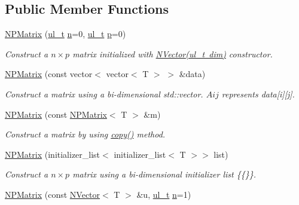 \subsection*{Public Member Functions}
\begin{DoxyCompactItemize}
\item 
\mbox{\hyperlink{class_n_p_matrix_a911b2434435553b06276977f3a86bb87}{N\+P\+Matrix}} (\mbox{\hyperlink{typedef_8h_a1b140a2034db3f5dfe18a987745df43a}{ul\+\_\+t}} \mbox{\hyperlink{class_n_p_matrix_afc181b7652d9427125c72c38d7c1498d}{n}}=0, \mbox{\hyperlink{typedef_8h_a1b140a2034db3f5dfe18a987745df43a}{ul\+\_\+t}} \mbox{\hyperlink{class_n_p_matrix_a3beee8acb5babf62d2b4f212ac5d18e8}{p}}=0)
\begin{DoxyCompactList}\small\item\em Construct a $ n \times p $ matrix initialized with {\ttfamily \mbox{\hyperlink{class_n_vector_a58eee5f012e4e563d477788051fc7f1d}{N\+Vector(ul\+\_\+t dim)}}} constructor. \end{DoxyCompactList}\item 
\mbox{\hyperlink{class_n_p_matrix_ad5fc4003cdc740be5eed12134929101c}{N\+P\+Matrix}} (const vector$<$ vector$<$ T $>$ $>$ \&data)
\begin{DoxyCompactList}\small\item\em Construct a matrix using a bi-\/dimensional {\ttfamily std\+::vector}. $ Aij $ represents {\ttfamily data\mbox{[}i\mbox{]}\mbox{[}j\mbox{]}}. \end{DoxyCompactList}\item 
\mbox{\hyperlink{class_n_p_matrix_a0965ea26fdfab766bf993ea79fdad13c}{N\+P\+Matrix}} (const \mbox{\hyperlink{class_n_p_matrix}{N\+P\+Matrix}}$<$ T $>$ \&m)
\begin{DoxyCompactList}\small\item\em Construct a matrix by using {\ttfamily \mbox{\hyperlink{class_n_p_matrix_ad2420de13cf39828daf36fd74aea9d2d}{copy()}}} method. \end{DoxyCompactList}\item 
\mbox{\hyperlink{class_n_p_matrix_a738c748de3e3615da067264b629652b0}{N\+P\+Matrix}} (initializer\+\_\+list$<$ initializer\+\_\+list$<$ T $>$$>$ list)
\begin{DoxyCompactList}\small\item\em Construct a $ n \times p $ matrix using a bi-\/dimensional initializer list {\ttfamily \{\{\}\}}. \end{DoxyCompactList}\item 
\mbox{\hyperlink{class_n_p_matrix_a70eca6f9b11e5ab39db67edcba220f34}{N\+P\+Matrix}} (const \mbox{\hyperlink{class_n_vector}{N\+Vector}}$<$ T $>$ \&u, \mbox{\hyperlink{typedef_8h_a1b140a2034db3f5dfe18a987745df43a}{ul\+\_\+t}} \mbox{\hyperlink{class_n_p_matrix_afc181b7652d9427125c72c38d7c1498d}{n}}=1)
$$
\end{DoxyCompactItemize}

